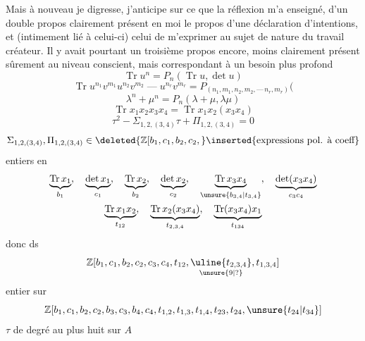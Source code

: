 Mais à nouveau je digresse,  j'anticipe sur ce que la réflexion m'a enseigné,
d'un double propos clairement présent en moi
le propos d'une déclaration d'intentions, et (intimement lié à celui-ci)
celui de m'exprimer au sujet de  nature du travail créateur.
Il y avait pourtant un troisième propos encore, moins clairement présent sûrement au niveau conscient,
mais correspondant à un besoin plus profond
\[\operatorname{Tr}u^n=P_n(\operatorname{Tr}u,\det u)\]
\[
\operatorname{Tr}u^{n_1}v^{m_1}u^{n_2}v^{m_2}\;\text{---}\;u^{n_r}v^{m_r}
=P_{(n_1,m_1,n_2,m_2,\text{---}\,n_r,m_r)}\bigl(
\]
\[\lambda^n+\mu^n=P_n(\lambda+\mu,\lambda\mu)\]
\[\operatorname{Tr}x_1x_2x_3x_4=\operatorname{Tr}x_1x_2(x_3x_4)\]
\[\tau^2-\Sigma_{1,2,(3,4)}\tau+\Pi_{1,2,(3,4)}=0\]
\[
\Sigma_{1,2,(3,4)},\Pi_{1,2,(3,4)}\in
\deleted{\mathbb Z[b_1,c_1,b_2,c_2,}
\inserted{\text{expressions pol. à coeff}}
\]
entiers en
\[
\begin{gathered}
\underbrace{\operatorname{Tr}x_1}_{b_1},\quad
\underbrace{\det x_1}_{c_1},\quad
\underbrace{\operatorname{Tr}x_2}_{b_2},\quad
\underbrace{\det x_2}_{c_2},\quad
\underbrace{\operatorname{Tr}x_3x_4}_{\unsure{b_{3,4}|t_{3,4}}},\quad
\underbrace{\det(x_3x_4)}_{c_3c_4}\\
\underbrace{\operatorname{Tr}x_1x_2}_{t_{12}},\quad
\underbrace{\operatorname{Tr}x_2(x_3x_4)}_{t_{2,3,4}},\quad
\underbrace{\operatorname{Tr}(x_3x_4)x_1}_{t_{134}}
\end{gathered}
\]
donc ds
\[
\mathbb Z[b_1,c_1,b_2,c_2,c_3,c_4,t_{12},
\underset{\unsure{9|?}}{\uline{t_{2,3,4}}},t_{1,3,4}]
\]
entier sur
\[
\mathbb Z[b_1,c_1,b_2,c_2,b_3,c_3,b_4,c_4,t_{1,2},t_{1,3},t_{1,4},
 t_{23},t_{24},\unsure{t_{24}|t_{34}}]
\]
$\tau$ de degré au plus huit sur $A$

